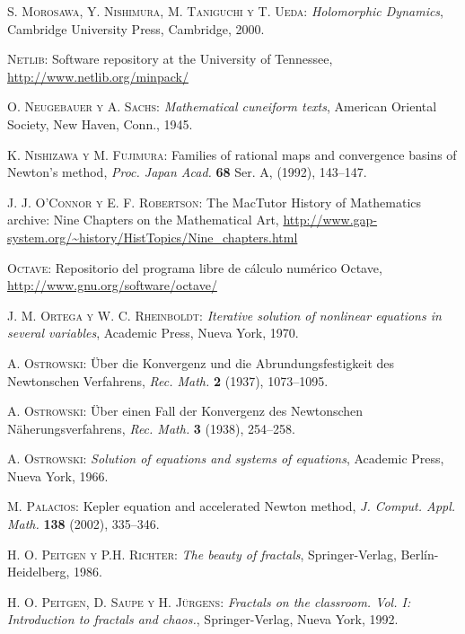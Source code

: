 \begin{thebibliography}{999}
 \textsc{S. Morosawa, Y. Nishimura, M. Taniguchi y T. Ueda}:
\textit{Holomorphic Dynamics},
Cambridge University Press, Cambridge, 2000.

\textsc{Netlib}:
Software repository at the University of Tennessee,
\url{http://www.netlib.org/minpack/}

\textsc{O. Neugebauer y A. Sachs}:
\textit{Mathematical cuneiform texts},
American Oriental Society, New Haven, Conn., 1945.


 \textsc{K. Nishizawa y M. Fujimura}:
 Families of rational
maps and convergence basins of Newton's method,
\textit{Proc. Japan Acad.} \textbf{68} Ser. A, (1992), 143--147.



\textsc{J. J. O'Connor y E. F. Robertson}:
The MacTutor History of Mathematics archive: Nine Chapters on the Mathematical Art,
\url{http://www.gap-system.org/~history/HistTopics/Nine_chapters.html}

\textsc{Octave}:
Repositorio del programa libre de cálculo numérico Octave,
\url{http://www.gnu.org/software/octave/}

\textsc{J. M. Ortega y W. C.  Rheinboldt}:
\textit{Iterative solution of nonlinear equations in several variables},
 Academic Press, Nueva York, 1970.

\textsc{A. Ostrowski}:
 Über die Konvergenz und die Abrundungsfestigkeit des Newtonschen Verfahrens,
\textit{Rec. Math.} \textbf{2} (1937), 1073--1095.

 \textsc{A. Ostrowski}:
Über einen Fall der Konvergenz des Newtonschen Näherungsverfahrens,
\textit{Rec. Math.} \textbf{3} (1938), 254--258.

\textsc{A. Ostrowski}:
\textit{Solution of equations and systems of equations},
 Academic Press, Nueva York, 1966.

\textsc{M. Palacios}:
Kepler equation and accelerated Newton method,
\textit{J. Comput. Appl. Math.} \textbf{138} (2002), 335--346.

\textsc{H. O. Peitgen y P.H. Richter}:
\textit{The beauty of fractals},
Springer-Verlag, Berlín-Heidelberg, 1986.

\textsc{H. O. Peitgen, D. Saupe y H. Jürgens}:
\textit{Fractals on the classroom. Vol. I: Introduction to fractals and chaos.},
Springer-Verlag, Nueva York, 1992.


\end{thebibliography}
